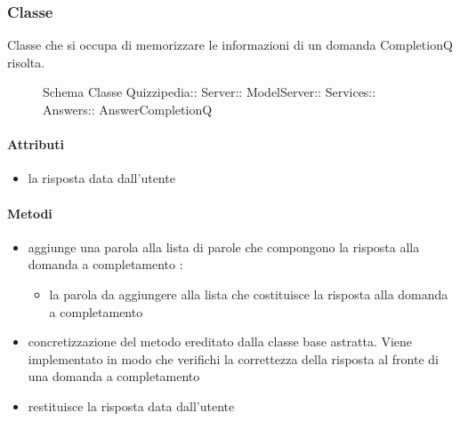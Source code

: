 \subsubsection{Classe }
Classe che si occupa di memorizzare le informazioni di un domanda CompletionQ risolta.
\begin{figure}[H]
\centering
\noindent{}
\caption[Schema Classe AnswerCompletionQ]{Schema Classe Quizzipedia:: Server:: ModelServer:: Services:: Answers:: AnswerCompletionQ}
\end{figure}
\paragraph{Attributi}
\begin{itemize}
\item {}
\newline
la risposta data dall'utente
\end{itemize}
\paragraph{Metodi}
\begin{itemize}
\item {}
\newline
aggiunge una parola alla lista di parole che compongono la risposta alla domanda a completamento
\newline
{} :
\begin{itemize}
\item {}
\newline
la parola da aggiungere alla lista che costituisce la risposta alla domanda a completamento
\end{itemize}
\item {}
\newline
concretizzazione del metodo ereditato dalla classe base astratta. Viene implementato in modo che verifichi la correttezza della risposta al fronte di una domanda a completamento
\newline
\item {}
\newline
restituisce la risposta data dall'utente
\newline
\end{itemize}
